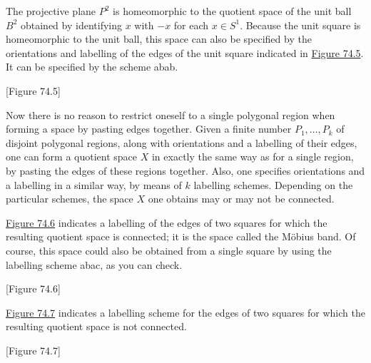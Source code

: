 \begin{centeredblock}
\begin{example}
\label{ex:\thesection.\theexample}
	The projective plane \(P^{2}\) is homeomorphic to the quotient space of the unit ball \(B^{2}\) obtained by identifying \(x\) with \(- x\) for each \(x \in {S}^{1}\). Because the unit square is homeomorphic to the unit ball, this space can also be specified by the orientations and labelling of the edges of the unit square indicated in \hyperref[fig:74.5]{Figure 74.5}. It can be specified by the scheme abab.

[Figure 74.5]
\end{example}
\end{centeredblock}

Now there is no reason to restrict oneself to a single polygonal region when forming a space by pasting edges together. Given a finite number \(P_{1},\ldots ,P_{k}\) of disjoint polygonal regions, along with orientations and a labelling of their edges, one can form a quotient space \(X\) in exactly the same way as for a single region, by pasting the edges of these regions together. Also, one specifies orientations and a labelling in a similar way, by means of \(k\) labelling schemes. Depending on the particular schemes, the space \(X\) one obtains may or may not be connected.

\begin{centeredblock}
\begin{example}
\label{ex:\thesection.\theexample}
	\hyperref[fig:74.6]{Figure 74.6} indicates a labelling of the edges of two squares for which the resulting quotient space is connected; it is the space called the Möbius band. Of course, this space could also be obtained from a single square by using the labelling scheme abac, as you can check.

[Figure 74.6]
\end{example}
\end{centeredblock}

\begin{centeredblock}
\begin{example}
\label{ex:\thesection.\theexample}
	\hyperref[fig:74.7]{Figure 74.7} indicates a labelling scheme for the edges of two squares for which the resulting quotient space is not connected.

[Figure 74.7]
\end{example}
\end{centeredblock}

